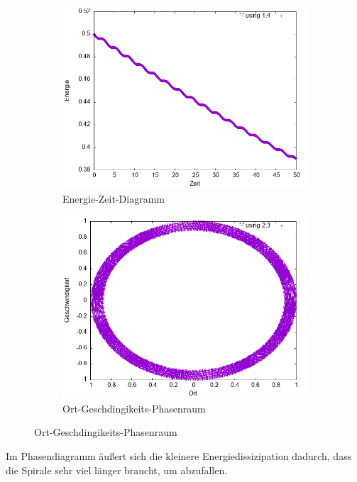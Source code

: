 \documentclass[
    oneside,
    ngerman,
    footinclude=false,
    captions=tableheading,
    DIV=12
]{scrartcl}
\begin{document}
            \begin{figure}[H]
            \centering
            \begin{subfigure}[b]{0.45\textwidth}
                \centering
                \includegraphics[width=\textwidth]{Bilddateien/LLA1(a)-001-E.png}
                \caption{Energie-Zeit-Diagramm}
                \label{fig:LLA1(a)-001-0-E}
            \end{subfigure}
            \hfill
            \begin{subfigure}[b]{0.45\textwidth}
                \centering
                \includegraphics[width=\textwidth]{Bilddateien/LLA1(a)-001-0-xv.png}
                \caption{Ort-Geschdingikeits-Phasenraum}
                \label{fig:LLA1(a)-001-0-xv}
            \end{subfigure}
            \end{figure}
            Im Phasendiagramm äußert sich die kleinere Energiedissizipation dadurch, dass die Spirale sehr viel länger braucht, um abzufallen.
\end{document}
